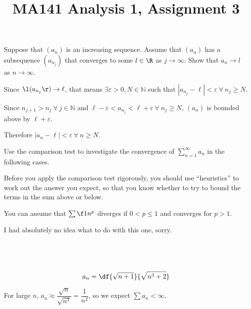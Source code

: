 \documentclass[a4paper]{article}
\title{MA141 Analysis 1, Assignment 3}
\begin{document}
\maketitle

\setlength{\parindent}{0em}
\setlength{\parskip}{1em}


\begin{questionbody}
Suppose that $(a_n)$ is an increasing sequence. Assume that $(a_n)$ has a subsequence $(a_{n_j})$ that converges to some $l \in \R$ as $j \to \infty$. Show that $a_n \to l$ as $n \to \infty$.
\end{questionbody}

Since $\l(a_{n_j}\r) \to \ell$, that means $\exists \varepsilon > 0, N \in \mathbb N$ such that $|a_{n_j} - \ell| < \varepsilon\ \forall\ n_j \ge N$.

Since $n_{j+1} > n_j\ \forall\ j \in \mathbb N$ and $\ell - \varepsilon < a_{n_j} < \ell + \varepsilon\ \forall\ n_j \ge N$, $(a_n)$ is bounded above by $\ell + \varepsilon$.

Therefore $|a_n - \ell| < \varepsilon\ \forall\ n \ge N$.


\begin{questionbody}
Use the comparison test to investigate the convergence of $\sum_{n=1}^\infty a_n$ in the following cases.

Before you apply the comparison test rigorously, you should use \enquote{heuristics} to work out the answer you expect, so that you know whether to try to bound the terms in the sum above or below.

You can assume that $\sum \f1{n^p}$ diverges if $0 < p \le 1$ and converges for $p > 1$.
\end{questionbody}

I had absolutely no idea what to do with this one, sorry.

\subsection{~} %

\begin{questionbody}
\[ a_n = \df{\sqrt{n + 1}}{\sqrt{n^3 + 2}} \]
\end{questionbody}

For large $n$, $a_n \approx \dfrac{\sqrt n}{\sqrt{n^3}} = \dfrac{1}{n^2}$, so we expect $\sum a_n < \infty$.
\end{document}
